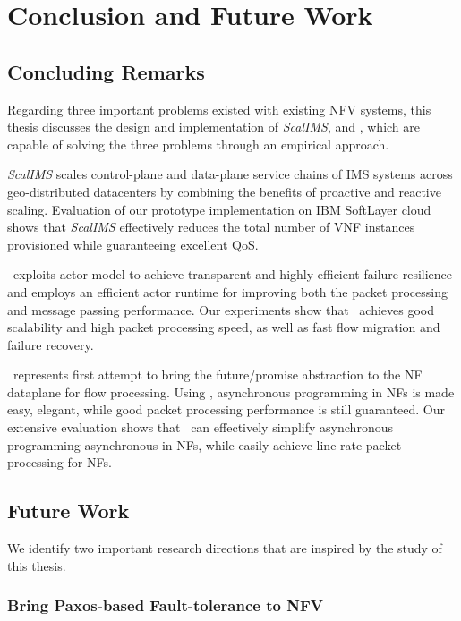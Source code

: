 \chapter {Conclusion and Future Work}
\label{ch:conclusion}

\section {Concluding Remarks}

Regarding three important problems existed with existing NFV systems, this thesis discusses the design and implementation of \textit{ScalIMS}, \nfactor and \netstar, which are capable of solving the three problems through an empirical approach.

\textit{ScalIMS} scales control-plane and data-plane service chains of IMS systems across geo-distributed datacenters by combining the benefits of proactive and reactive scaling. Evaluation of our prototype implementation on IBM SoftLayer cloud shows that \textit{ScalIMS} effectively reduces the total number of VNF instances provisioned while guaranteeing excellent QoS.

\nfactor~exploits actor model to achieve transparent and highly efficient failure resilience and employs an efficient actor runtime for improving both the packet processing and message passing performance. Our experiments show that \nfactor~achieves good scalability and high packet processing speed, as well as fast flow migration and failure recovery.

\netstar~represents first attempt to bring the future/promise abstraction to the NF dataplane for flow processing. Using \netstar, asynchronous programming in NFs is made easy, elegant, while good packet processing performance is still guaranteed. Our extensive evaluation shows that \netstar~can effectively simplify asynchronous programming asynchronous in NFs, while easily achieve line-rate packet processing for NFs.

\section {Future Work}

We identify two important research directions that are inspired by the study of this thesis.

\subsection{Bring Paxos-based Fault-tolerance to NFV}

